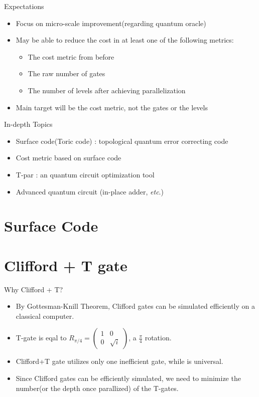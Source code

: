 \documentclass{beamer}
\begin{document}
    \begin{frame}{Expectations}
      \begin{itemize}
        \item Focus on micro-scale improvement(regarding quantum oracle)
        \item May be able to reduce the cost in at least one of the following metrics:
          \begin{itemize}
            \item The cost metric from before
            \item The raw number of gates
            \item The number of levels after achieving parallelization
          \end{itemize}
        \item Main target will be the cost metric, not the gates or the levels
      \end{itemize}
    \end{frame}
    
    \begin{frame}{In-depth Topics}
        \begin{itemize}
            \item Surface code(Toric code) : topological quantum error correcting code
            \item Cost metric based on surface code
            \item T-par \cite{amy2014polynomial} : an quantum circuit optimization tool
            \item Advanced quantum circuit (in-place adder, \textit{etc}.)
        \end{itemize}
    \end{frame}
    
    \section{Surface Code}
    
    
    \section{Clifford + T gate}
    \begin{frame}{Why Clifford + T?}
    	\begin{itemize}
    		\item By Gottesman-Knill Theorem, Clifford gates can be simulated efficiently on a classical computer.
    		\item T-gate is eqal to $R_{\pi/4}=\begin{pmatrix}1 & 0 \\ 0 & \sqrt{i}\end{pmatrix}$, a $\frac{\pi}{4}$ rotation.
    		\item Clifford+T gate utilizes only one inefficient gate, while is universal.
    		\item Since Clifford gates can be efficiently simulated, we need to minimize the number(or the depth once parallized) of the T-gates.
    	\end{itemize}
    \end{frame}
    
\end{document}
